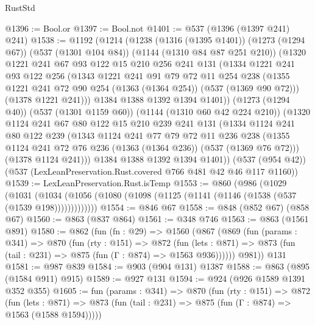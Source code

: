 \begin{lexlean}{RustStd}
\begin{coremodule}
@1396 := Bool.or
@1397 := Bool.not
@1401 := @537 (@1396 (@1397 @241) @241)
@1538 := @1192
    (@1214
      (@1238
        (@1316 (@1395 @1401))
        (@1273 (@1294 @67))
        (@537 (@1301 @104 @84))
        (@1144 (@1310 @84 @87 @251 @210))
        (@1320
          @1221
          @241
          @67
          @93
          @122
          @15
          @210
          @256
          @241
          @131
          (@1334
            @1221
            @241
            @93
            @122
            @256
            (@1343
              @1221
              @241
              @91
              @79
              @72
              @11
              @254
              @238
              (@1355 @1221 @241 @72 @90 @254 (@1363 (@1364 @254)) (@537 (@1369 @90 @72)))
              (@1378 @1221 @241)))
          @1384
          @1388
          @1392
          @1394
          @1401))
      (@1273 (@1294 @40))
      (@537 (@1301 @1159 @60))
      (@1144 (@1310 @60 @42 @224 @210))
      (@1320
        @1124
        @241
        @67
        @80
        @122
        @15
        @210
        @239
        @241
        @131
        (@1334
          @1124
          @241
          @80
          @122
          @239
          (@1343
            @1124
            @241
            @77
            @79
            @72
            @11
            @236
            @238
            (@1355 @1124 @241 @72 @76 @236 (@1363 (@1364 @236)) (@537 (@1369 @76 @72)))
            (@1378 @1124 @241)))
        @1384
        @1388
        @1392
        @1394
        @1401))
    (@537 (@954 @42))
    (@537 (LexLeanPreservation.Rust.covered @766 @481 @42 @46 @117 @1160))
@1539 := LexLeanPreservation.Rust.isTemp
@1553 := @860
    (@986
      (@1029
        (@1031
          (@1034 (@1056 (@1080 (@1098 (@1125 (@1141 (@1146 (@1538 (@537 (@1539 @198)))))))))))))
@1554 := @846 @67
@1558 := @848 (@852 @67) (@858 @67)
@1560 := @863 (@837 @864)
@1561 := @348 @746
@1563 := @863 (@1561 @891)
@1580 := @862
    (fun (fn : @29) =>
    @1560
      (@867
        (@869
          (fun (params : @341) =>
          @870
            (fun (rty : @151) =>
            @872
              (fun (lets : @871) =>
              @873 (fun (tail : @231) => @875 (fun (Γ : @874) => @1563 @936))))))
        @981))
    @131
@1581 := @987 @839
@1584 := @903 (@904 @131) @1387
@1588 := @863 (@895 (@1584 @911) @915)
@1589 := @927 @131
@1594 := @924 (@926 @1589 @1391 @352 @355)
@1605 := fun (params : @341) =>
  @870
    (fun (rty : @151) =>
    @872
      (fun (lets : @871) =>
      @873 (fun (tail : @231) => @875 (fun (Γ : @874) => @1563 (@1588 @1594)))))

\end{coremodule}
\end{lexlean}
